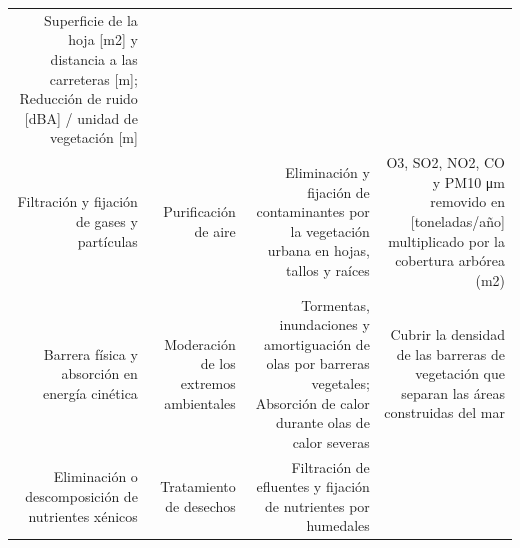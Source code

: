 \documentclass[12pt,]{book}
\begin{document}
\begin{longtable}[]{@{}rrrr@{}}
\begin{minipage}[t]{0.22\columnwidth}
Superficie de la hoja {[}m2{]} y distancia a las carreteras {[}m{]};
Reducción de ruido {[}dBA{]} / unidad de vegetación {[}m{]}\strut
\end{minipage}\tabularnewline
\begin{minipage}[t]{0.26\columnwidth}\raggedleft\strut
Filtración y fijación de gases y partículas\strut
\end{minipage} & \begin{minipage}[t]{0.22\columnwidth}\raggedleft\strut
Purificación de aire\strut
\end{minipage} & \begin{minipage}[t]{0.19\columnwidth}\raggedleft\strut
Eliminación y fijación de contaminantes por la vegetación urbana en
hojas, tallos y raíces\strut
\end{minipage} & \begin{minipage}[t]{0.22\columnwidth}\raggedleft\strut
O3, SO2, NO2, CO y PM10 μm removido en {[}toneladas/año{]} multiplicado
por la cobertura arbórea (m2)\strut
\end{minipage}\tabularnewline
\begin{minipage}[t]{0.26\columnwidth}\raggedleft\strut
Barrera física y absorción en energía cinética\strut
\end{minipage} & \begin{minipage}[t]{0.22\columnwidth}\raggedleft\strut
Moderación de los extremos ambientales\strut
\end{minipage} & \begin{minipage}[t]{0.19\columnwidth}\raggedleft\strut
Tormentas, inundaciones y amortiguación de olas por barreras vegetales;
Absorción de calor durante olas de calor severas\strut
\end{minipage} & \begin{minipage}[t]{0.22\columnwidth}\raggedleft\strut
Cubrir la densidad de las barreras de vegetación que separan las áreas
construidas del mar\strut
\end{minipage}\tabularnewline
\begin{minipage}[t]{0.26\columnwidth}\raggedleft\strut
Eliminación o descomposición de nutrientes xénicos\strut
\end{minipage} & \begin{minipage}[t]{0.22\columnwidth}\raggedleft\strut
Tratamiento de desechos\strut
\end{minipage} & \begin{minipage}[t]{0.19\columnwidth}\raggedleft\strut
Filtración de efluentes y fijación de nutrientes por humedales

\end{minipage}
\end{longtable}
\end{document}
